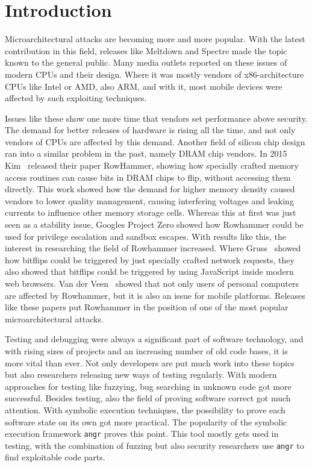 \chapter{Introduction}\label{sec:intro}

Microarchitectural attacks are becoming more and more popular. With the latest
contribution in this field, releases like Meltdown\cite{meltdown} and
Spectre\cite{spectre} made the topic known to the general public. Many media
outlets reported on these issues of modern CPUs and their design. Where it was
mostly vendors of x86-architecture CPUs like Intel or AMD, also ARM, and with
it, most mobile devices were affected by such exploiting techniques.

Issues like these show one more time that vendors set performance above
security. The demand for better releases of hardware is rising all the time, and
not only vendors of CPUs are affected by this demand. Another field of silicon
chip design ran into a similar problem in the past, namely DRAM chip vendors. In
2015 Kim~\etal\cite{rowhammergeneral} released their paper \textquotedbl
RowHammer\textquotedbl, showing how specially crafted memory access routines
can cause bits in DRAM chips to flip, without accessing them directly. This
work showed how the demand for higher memory density caused vendors to lower
quality management, causing interfering voltages and leaking currents to
influence other memory storage cells. Whereas this at first was just seen as a
stability issue, Google\textquotesingle s Project Zero showed how Rowhammer
could be used for privilege escalation and sandbox
escapes\cite{projectzerorow}. With results like this, the interest in
researching the field of Rowhammer increased. Where Gruss~\etal\cite{nethammer}
showed how bitflips could be triggered by just specially crafted network
requests, they also showed that bitflips could be triggered by using JavaScript
inside modern web browsers\cite{rowhammerjs}. Van der Veen~\etal\cite{drammer}
showed that not only users of personal computers are affected by Rowhammer, but
it is also an issue for mobile platforms. Releases like these papers put
Rowhammer in the position of one of the most popular microarchitectural attacks.

Testing and debugging were always a significant part of software technology, and
with rising sizes of projects and an increasing number of old code bases, it is
more vital than ever. Not only developers are put much work into these
topics but also researchers releasing new ways of testing regularly. With modern
approaches for testing like fuzzying, bug searching in unknown code got more
successful. Besides testing, also the field of proving software correct got
much attention. With symbolic execution techniques, the possibility to prove
each software state on its own got more practical. The popularity of the
symbolic execution framework \texttt{angr}\cite{angrpaper} proves this point.
This tool mostly gets used in testing, with the combination of fuzzing but also
security researchers use \texttt{angr} to find exploitable code parts.

